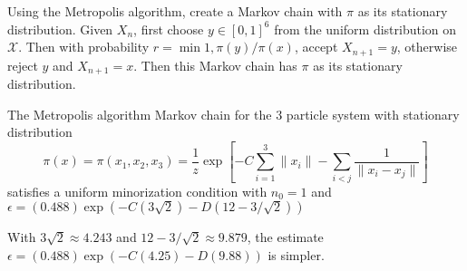 \documentclass[12pt]{article}
\begin{document}
Using the Metropolis algorithm, create a Markov chain with \( \pi \) as
its stationary distribution.  Given \( X_n \), first choose \( y \in [0,1]^6
\) from the uniform distribution on \( \mathcal{X} \).  Then with
probability \( r = \min{1, \pi(y)/\pi(x)} \), accept \( X_{n+1} = y \),
otherwise reject \( y \) and \( X_{n+1} = x \).  Then this Markov chain
has \( \pi \) as its stationary distribution.

\begin{lemma}
    The Metropolis algorithm Markov chain for the \( 3 \) particle
    system with stationary distribution
    \[
        \pi(x) = \pi(x_1,x_2,x_3) = \frac{1}{z} \exp\left[ -C \sum\limits_
        {i=1}^3 \|x_i\| - \sum\limits_{i<j} \frac{1}{\| x_i - x_j \|}
        \right]
    \] satisfies a uniform minorization condition with \( n_0 = 1 \) and
    \( \epsilon = (0.488) \exp(-C(3 \sqrt{2}) - D(12 - 3/ \sqrt{2})) \)
\end{lemma}

\begin{remark}

\end{remark}
With \( 3 \sqrt{2} \approx 4.243 \) and \( 12 - 3/\sqrt{2} \approx 9.879
\), the estimate \( \epsilon = (0.488) \exp(-C(4.25) - D(9.88)) \) is
simpler.
\end{document}
